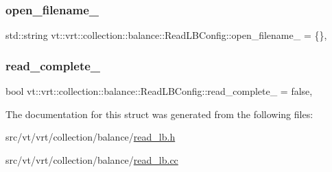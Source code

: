 \subsubsection{\texorpdfstring{open\+\_\+filename\+\_\+}{open\_filename\_}}
{\footnotesize\ttfamily std\+::string vt\+::vrt\+::collection\+::balance\+::\+Read\+L\+B\+Config\+::open\+\_\+filename\+\_\+ = \{\}\hspace{0.3cm}{\ttfamily [static]}, {\ttfamily [private]}}

\mbox{\label{structvt_1_1vrt_1_1collection_1_1balance_1_1_read_l_b_config_a1fcb6cf46a05f2b3bf3a3131f14310c0}} 
\subsubsection{\texorpdfstring{read\+\_\+complete\+\_\+}{read\_complete\_}}
{\footnotesize\ttfamily bool vt\+::vrt\+::collection\+::balance\+::\+Read\+L\+B\+Config\+::read\+\_\+complete\+\_\+ = false\hspace{0.3cm}{\ttfamily [static]}, {\ttfamily [private]}}



The documentation for this struct was generated from the following files\+:\begin{DoxyCompactItemize}
\item 
src/vt/vrt/collection/balance/\hyperlink{read__lb_8h}{read\+\_\+lb.\+h}\item 
src/vt/vrt/collection/balance/\hyperlink{read__lb_8cc}{read\+\_\+lb.\+cc}\end{DoxyCompactItemize}
